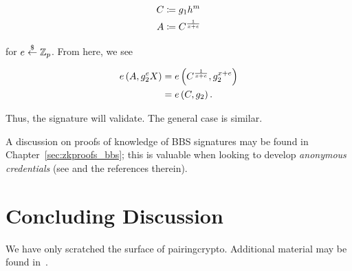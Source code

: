 \begin{align}
    C &\coloneqq{} g_{1}h^{m} \nonumber\\
    A &\coloneqq{} C^{\frac{1}{x + e}}
\end{align}

\noindent
for $e\stackrel{\$}{\leftarrow}{} \mathbb{Z}_{p}$.
From here, we see

\begin{align}
    e\left( A, g_{2}^{e}X \right) &= e\left( C^{\frac{1}{x+e}}, g_{2}^{x+e} \right)
            \nonumber\\
        &= e\left( C, g_{2} \right).
\end{align}

\noindent
Thus, the signature will validate.
The general case is similar.

A discussion on proofs of knowledge of BBS signatures may be found in
Chapter~\ref{sec:zkproofs_bbs};
this is valuable when looking to develop
\emph{anonymous credentials}
(see \cite[Introduction]{cryptoeprint:2023/275} and the references therein).



\section{Concluding Discussion}

We have only scratched the surface of \gls{pairingcrypto}.
Additional material may be found in~\cite{PairingBasedCrypto}.
